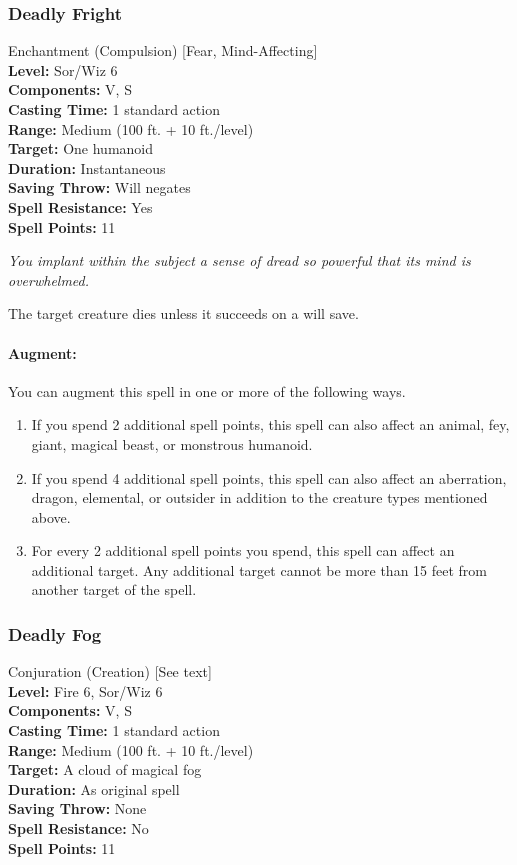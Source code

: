 \subsubsection{Deadly Fright}
\label{Spell:DeadlyFright}
Enchantment (Compulsion) [Fear, Mind-Affecting]
\\ \textbf{Level:} Sor/Wiz 6
\\ \textbf{Components:} V, S
\\ \textbf{Casting Time:} 1 standard action
\\ \textbf{Range:} Medium (100 ft. + 10 ft./level)
\\ \textbf{Target:} One humanoid
\\ \textbf{Duration:} Instantaneous
\\ \textbf{Saving Throw:} Will negates
\\ \textbf{Spell Resistance:} Yes
\\ \textbf{Spell Points:} 11

\emph{You implant within the subject a sense of dread so powerful that its mind is overwhelmed.}

The target creature dies unless it succeeds on a will save.

\paragraph{Augment:} You can augment this spell in one or more of the following ways.
\begin{enumerate}
 \item If you spend 2 additional spell points, this spell can also affect an animal, fey, giant, magical beast, or monstrous humanoid.
 \item If you spend 4 additional spell points, this spell can also affect an aberration, 
 dragon, elemental, or outsider in addition to the creature types mentioned above.
 \item For every 2 additional spell points you spend, this spell can affect an additional target. 
 Any additional target cannot be more than 15 feet from another target of the spell.
\end{enumerate}

\subsubsection{Deadly Fog}
\label{Spell:DeadlyFog}
Conjuration (Creation) [See text]
\\ \textbf{Level:} Fire 6, Sor/Wiz 6
\\ \textbf{Components:} V, S
\\ \textbf{Casting Time:} 1 standard action
\\ \textbf{Range:} Medium (100 ft. + 10 ft./level)
\\ \textbf{Target:} A cloud of magical fog
\\ \textbf{Duration:} As original spell
\\ \textbf{Saving Throw:} None
\\ \textbf{Spell Resistance:} No
\\ \textbf{Spell Points:} 11

